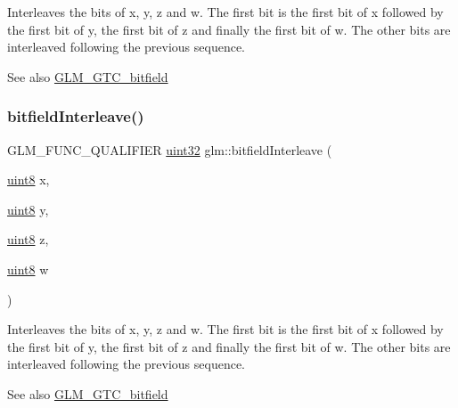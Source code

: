 Interleaves the bits of x, y, z and w. The first bit is the first bit of x followed by the first bit of y, the first bit of z and finally the first bit of w. The other bits are interleaved following the previous sequence.

\begin{DoxySeeAlso}{See also}
\hyperlink{group__gtc__bitfield}{G\+L\+M\+\_\+\+G\+T\+C\+\_\+bitfield} 
\end{DoxySeeAlso}
\mbox{\label{group__gtc__bitfield_ga447c0bbed9d60c14578626d8f03f3755}} 
\subsubsection{\texorpdfstring{bitfield\+Interleave()}{bitfieldInterleave()}\hspace{0.1cm}{\footnotesize\ttfamily [14/16]}}
{\footnotesize\ttfamily G\+L\+M\+\_\+\+F\+U\+N\+C\+\_\+\+Q\+U\+A\+L\+I\+F\+I\+ER \hyperlink{group__gtc__type__precision_ga202b6a53c105fcb7e531f9b443518451}{uint32} glm\+::bitfield\+Interleave (\begin{DoxyParamCaption}\item[{\hyperlink{group__gtc__type__precision_ga1a7dcd8aac97cc8020817c94049deff2}{uint8}}]{x,  }\item[{\hyperlink{group__gtc__type__precision_ga1a7dcd8aac97cc8020817c94049deff2}{uint8}}]{y,  }\item[{\hyperlink{group__gtc__type__precision_ga1a7dcd8aac97cc8020817c94049deff2}{uint8}}]{z,  }\item[{\hyperlink{group__gtc__type__precision_ga1a7dcd8aac97cc8020817c94049deff2}{uint8}}]{w }\end{DoxyParamCaption})}

Interleaves the bits of x, y, z and w. The first bit is the first bit of x followed by the first bit of y, the first bit of z and finally the first bit of w. The other bits are interleaved following the previous sequence.

\begin{DoxySeeAlso}{See also}
\hyperlink{group__gtc__bitfield}{G\+L\+M\+\_\+\+G\+T\+C\+\_\+bitfield} 
\end{DoxySeeAlso}
\mbox{\label{group__gtc__bitfield_ga09ee0be0fac790a1607a711e597dd9bf}} 
